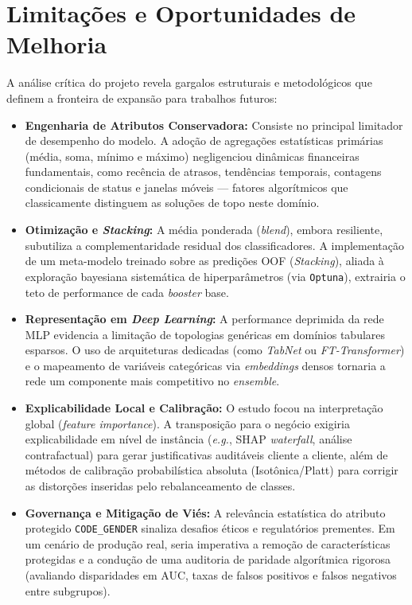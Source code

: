 \documentclass[10pt,a4paper]{article}
\begin{document}
\section{Limitações e Oportunidades de Melhoria}
A análise crítica do projeto revela gargalos estruturais e metodológicos que definem a fronteira de expansão para trabalhos futuros:

\begin{itemize}
    \item \textbf{Engenharia de Atributos Conservadora:} Consiste no principal limitador de desempenho do modelo. A adoção de agregações estatísticas primárias (média, soma, mínimo e máximo) negligenciou dinâmicas financeiras fundamentais, como recência de atrasos, tendências temporais, contagens condicionais de status e janelas móveis --- fatores algorítmicos que classicamente distinguem as soluções de topo neste domínio.
    \item \textbf{Otimização e \textit{Stacking}:} A média ponderada (\textit{blend}), embora resiliente, subutiliza a complementaridade residual dos classificadores. A implementação de um meta-modelo treinado sobre as predições OOF (\textit{Stacking}), aliada à exploração bayesiana sistemática de hiperparâmetros (via \texttt{Optuna}), extrairia o teto de performance de cada \textit{booster} base.
    \item \textbf{Representação em \textit{Deep Learning}:} A performance deprimida da rede MLP evidencia a limitação de topologias genéricas em domínios tabulares esparsos. O uso de arquiteturas dedicadas (como \textit{TabNet} ou \textit{FT-Transformer}) e o mapeamento de variáveis categóricas via \textit{embeddings} densos tornaria a rede um componente mais competitivo no \textit{ensemble}.
    \item \textbf{Explicabilidade Local e Calibração:} O estudo focou na interpretação global (\textit{feature importance}). A transposição para o negócio exigiria explicabilidade em nível de instância (\textit{e.g.}, SHAP \textit{waterfall}, análise contrafactual) para gerar justificativas auditáveis cliente a cliente, além de métodos de calibração probabilística absoluta (Isotônica/Platt) para corrigir as distorções inseridas pelo rebalanceamento de classes.
    \item \textbf{Governança e Mitigação de Viés:} A relevância estatística do atributo protegido \texttt{CODE\_GENDER} sinaliza desafios éticos e regulatórios prementes. Em um cenário de produção real, seria imperativa a remoção de características protegidas e a condução de uma auditoria de paridade algorítmica rigorosa (avaliando disparidades em AUC, taxas de falsos positivos e falsos negativos entre subgrupos).
\end{itemize}
\end{document}
